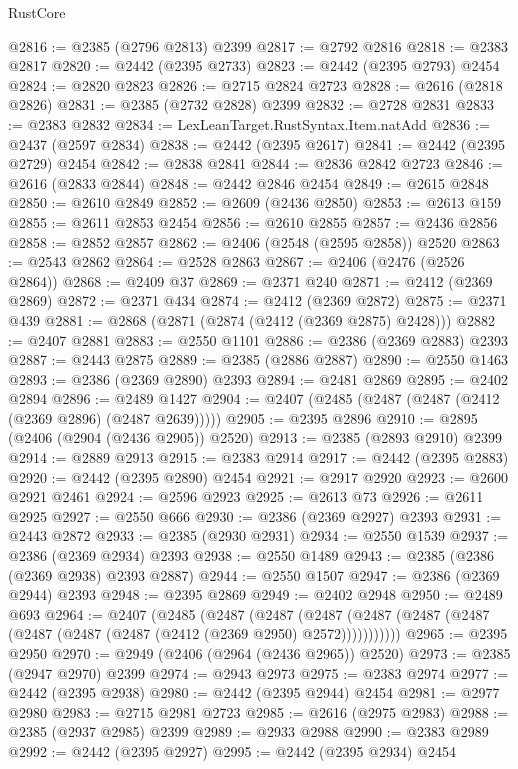 \begin{lexlean}{RustCore}
\begin{coremodule}
@2816 := @2385 (@2796 @2813) @2399
@2817 := @2792 @2816
@2818 := @2383 @2817
@2820 := @2442 (@2395 @2733)
@2823 := @2442 (@2395 @2793) @2454
@2824 := @2820 @2823
@2826 := @2715 @2824 @2723
@2828 := @2616 (@2818 @2826)
@2831 := @2385 (@2732 @2828) @2399
@2832 := @2728 @2831
@2833 := @2383 @2832
@2834 := LexLeanTarget.RustSyntax.Item.natAdd
@2836 := @2437 (@2597 @2834)
@2838 := @2442 (@2395 @2617)
@2841 := @2442 (@2395 @2729) @2454
@2842 := @2838 @2841
@2844 := @2836 @2842 @2723
@2846 := @2616 (@2833 @2844)
@2848 := @2442 @2846 @2454
@2849 := @2615 @2848
@2850 := @2610 @2849
@2852 := @2609 (@2436 @2850)
@2853 := @2613 @159
@2855 := @2611 @2853 @2454
@2856 := @2610 @2855
@2857 := @2436 @2856
@2858 := @2852 @2857
@2862 := @2406 (@2548 (@2595 @2858)) @2520
@2863 := @2543 @2862
@2864 := @2528 @2863
@2867 := @2406 (@2476 (@2526 @2864))
@2868 := @2409 @37
@2869 := @2371 @240
@2871 := @2412 (@2369 @2869)
@2872 := @2371 @434
@2874 := @2412 (@2369 @2872)
@2875 := @2371 @439
@2881 := @2868 (@2871 (@2874 (@2412 (@2369 @2875) @2428)))
@2882 := @2407 @2881
@2883 := @2550 @1101
@2886 := @2386 (@2369 @2883) @2393
@2887 := @2443 @2875
@2889 := @2385 (@2886 @2887)
@2890 := @2550 @1463
@2893 := @2386 (@2369 @2890) @2393
@2894 := @2481 @2869
@2895 := @2402 @2894
@2896 := @2489 @1427
@2904 := @2407 (@2485 (@2487 (@2487 (@2412 (@2369 @2896) (@2487 @2639)))))
@2905 := @2395 @2896
@2910 := @2895 (@2406 (@2904 (@2436 @2905)) @2520)
@2913 := @2385 (@2893 @2910) @2399
@2914 := @2889 @2913
@2915 := @2383 @2914
@2917 := @2442 (@2395 @2883)
@2920 := @2442 (@2395 @2890) @2454
@2921 := @2917 @2920
@2923 := @2600 @2921 @2461
@2924 := @2596 @2923
@2925 := @2613 @73
@2926 := @2611 @2925
@2927 := @2550 @666
@2930 := @2386 (@2369 @2927) @2393
@2931 := @2443 @2872
@2933 := @2385 (@2930 @2931)
@2934 := @2550 @1539
@2937 := @2386 (@2369 @2934) @2393
@2938 := @2550 @1489
@2943 := @2385 (@2386 (@2369 @2938) @2393 @2887)
@2944 := @2550 @1507
@2947 := @2386 (@2369 @2944) @2393
@2948 := @2395 @2869
@2949 := @2402 @2948
@2950 := @2489 @693
@2964 := @2407
    (@2485
      (@2487
        (@2487
          (@2487 (@2487 (@2487 (@2487 (@2487 (@2487 (@2487 (@2412 (@2369 @2950) @2572)))))))))))
@2965 := @2395 @2950
@2970 := @2949 (@2406 (@2964 (@2436 @2965)) @2520)
@2973 := @2385 (@2947 @2970) @2399
@2974 := @2943 @2973
@2975 := @2383 @2974
@2977 := @2442 (@2395 @2938)
@2980 := @2442 (@2395 @2944) @2454
@2981 := @2977 @2980
@2983 := @2715 @2981 @2723
@2985 := @2616 (@2975 @2983)
@2988 := @2385 (@2937 @2985) @2399
@2989 := @2933 @2988
@2990 := @2383 @2989
@2992 := @2442 (@2395 @2927)
@2995 := @2442 (@2395 @2934) @2454

\end{coremodule}
\end{lexlean}
